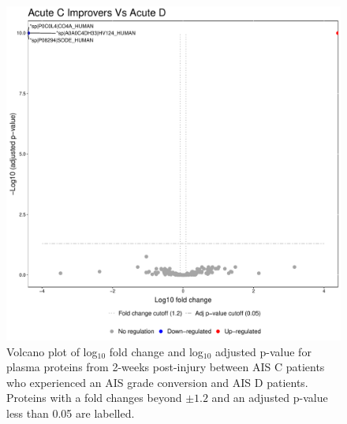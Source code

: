 \documentclass[9pt,lineno]{elife}
\begin{document}
\begin{figure}
\includegraphics[width=1\linewidth]{figures/openms_protein_quantification/label_free/volcano_plots/openms_volcano_plot_2021-08-10_0009} \caption{Volcano plot of log\(_10\) fold change and log\(_10\) adjusted p-value for plasma proteins from 2-weeks post-injury between AIS C patients who experienced an AIS grade conversion and AIS D patients. Proteins with a fold changes beyond \(\pm 1.2\) and an adjusted p-value less than 0.05 are labelled.}\label{fig:volc-plot-acute-c-imp-vs-acute-d}
\end{figure}
\end{document}
